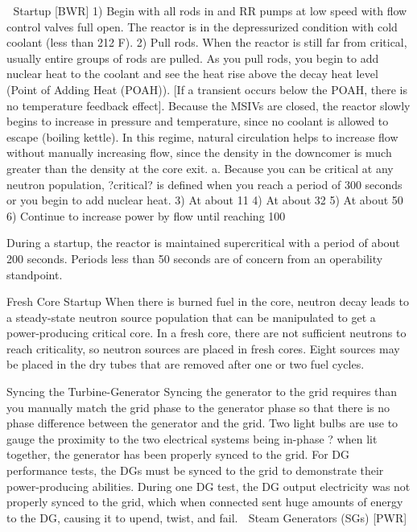 \documentclass[10pt]{article}
\begin{document}

Startup [BWR]
1)	Begin with all rods in and RR pumps at low speed with flow control valves full open. The reactor is in the depressurized condition with cold coolant (less than 212 F). 
2)	Pull rods. When the reactor is still far from critical, usually entire groups of rods are pulled. As you pull rods, you begin to add nuclear heat to the coolant and see the heat rise above the decay heat level (Point of Adding Heat (POAH)). [If a transient occurs below the POAH, there is no temperature feedback effect]. Because the MSIVs are closed, the reactor slowly begins to increase in pressure and temperature, since no coolant is allowed to escape (boiling kettle). In this regime, natural circulation helps to increase flow without manually increasing flow, since the density in the downcomer is much greater than the density at the core exit. 
a.	Because you can be critical at any neutron population, ?critical? is defined when you reach a period of 300 seconds or you begin to add nuclear heat. 
3)	At about 11%
4)	At about 32%
5)	At about 50%
6)	Continue to increase power by flow until reaching 100%

During a startup, the reactor is maintained supercritical with a period of about 200 seconds. Periods less than 50 seconds are of concern from an operability standpoint. 

Fresh Core Startup
When there is burned fuel in the core, neutron decay leads to a steady-state neutron source population that can be manipulated to get a power-producing critical core. In a fresh core, there are not sufficient neutrons to reach criticality, so neutron sources are placed in fresh cores. Eight sources may be placed in the dry tubes that are removed after one or two fuel cycles. 

Syncing the Turbine-Generator
Syncing the generator to the grid requires than you manually match the grid phase to the generator phase so that there is no phase difference between the generator and the grid. Two light bulbs are use to gauge the proximity to the two electrical systems being in-phase ? when lit together, the generator has been properly synced to the grid. For DG performance tests, the DGs must be synced to the grid to demonstrate their power-producing abilities. During one DG test, the DG output electricity was not properly synced to the grid, which when connected sent huge amounts of energy to the DG, causing it to upend, twist, and fail. 

Steam Generators (SGs) [PWR]
\end{document}
